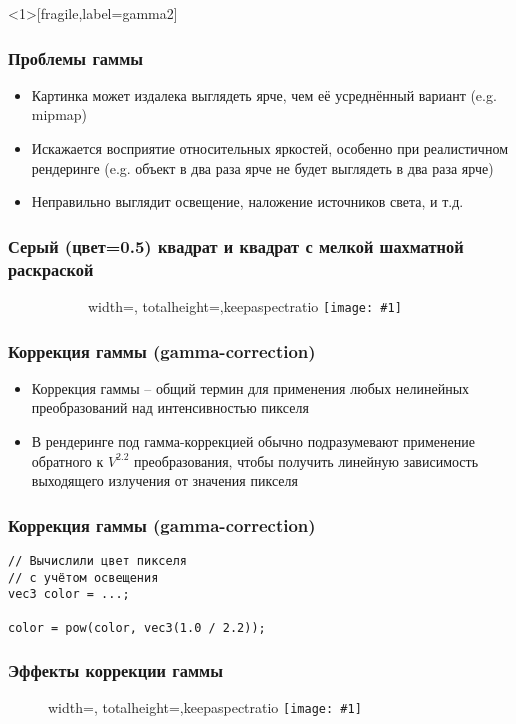\documentclass{beamer}
\newcommand{\slideimage}[1]{
  \begin{figure}
    \begin{adjustbox}{width=\textwidth, totalheight=\textheight-2\baselineskip-2\baselineskip,keepaspectratio}
      \texttt{[image: \#1]}
    \end{adjustbox}
  \end{figure}
}
\begin{document}

\begin{frame}<1>[fragile,label=gamma2]
\frametitle{Проблемы гаммы}
\begin{itemize}
\item Картинка может издалека выглядеть ярче, чем её усреднённый вариант (e.g. mipmap)
\pause
\item Искажается восприятие относительных яркостей, особенно при реалистичном рендеринге (e.g. объект в два раза ярче не будет выглядеть в два раза ярче)
\pause
\item Неправильно выглядит освещение, наложение источников света, и т.д.
\end{itemize}
\end{frame}

\begin{frame}
\frametitle{Серый (цвет=0.5) квадрат и квадрат с мелкой шахматной раскраской}
\begin{figure}
\slideimage{gamma-checkers.png}
\end{figure}
\end{frame}


\begin{frame}[fragile]
\frametitle{Коррекция гаммы (gamma-correction)}
\begin{itemize}
\item Коррекция гаммы -- общий термин для применения любых нелинейных преобразований над интенсивностью пикселя
\pause
\item В рендеринге под гамма-коррекцией обычно подразумевают применение обратного к \begin{math}V^{2.2}\end{math} преобразования, чтобы получить линейную зависимость выходящего излучения от значения пикселя
\end{itemize}
\end{frame}

\begin{frame}[fragile]
\frametitle{Коррекция гаммы (gamma-correction)}
\begin{verbatim}
// Вычислили цвет пикселя
// с учётом освещения
vec3 color = ...;

color = pow(color, vec3(1.0 / 2.2));
\end{verbatim}
\end{frame}

\begin{frame}[fragile]
\frametitle{Эффекты коррекции гаммы}
\slideimage{gamma-ex1.png}
\end{frame}
\end{document}

